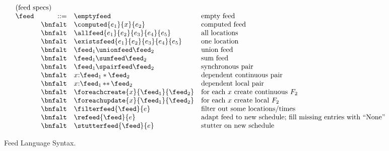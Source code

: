 \begin{figure*}[t]
\[
\begin{array}{lrll}
\multicolumn{4}{l}{\mbox{(feed specs)}}\\ 
\feed & ::=     
& \emptyfeed & \mbox{empty feed} \\
 & \bnfalt & \computed{e_1}{x}{e_2} & \mbox{computed feed} \\
 & \bnfalt & \allfeed{e_1}{e_2}{e_3}{e_4}{e_5} & \mbox{all locations} \\
 & \bnfalt & \existsfeed{e_1}{e_2}{e_3}{e_4}{e_5} & \mbox{one location} \\
 & \bnfalt & \feed_1 \unionfeed \feed_2 & \mbox{union feed} \\
 & \bnfalt & \feed_1 \sumfeed \feed_2 & \mbox{sum feed} \\
 & \bnfalt & \feed_1 \spairfeed \feed_2 & \mbox{synchronous pair} \\
 & \bnfalt & x{:}\feed_1 * \feed_2 & \mbox{dependent continuous pair} \\
 & \bnfalt & x{:}\feed_1\, {*}{*} \, \feed_2 & \mbox{dependent local pair} \\
 & \bnfalt & \foreachcreate{x}{\feed_1}{\feed_2} & \mbox{for each $x$ create continuous $F_2$} \\
 & \bnfalt & \foreachupdate{x}{\feed_1}{\feed_2} & \mbox{for each $x$ create local $F_2$} \\
 & \bnfalt & \filterfeed{\feed}{e} & \mbox{filter out some locations/times} \\
 & \bnfalt & \refeed{\feed}{e} & \mbox{adapt feed to new schedule; 
                                               fill missing entries with ``None''} \\
 & \bnfalt & \stutterfeed{\feed}{e} & \mbox{stutter on new schedule} \\

\end{array}
\]
\caption{Feed Language Syntax.}
\label{fig:syntax}
\end{figure*}


